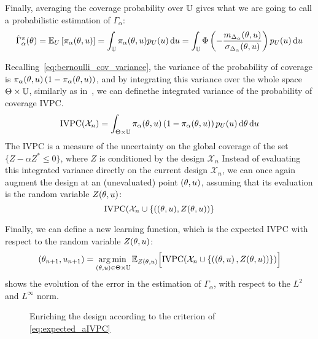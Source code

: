 \documentclass[../../Main_ManuscritThese.tex]{subfiles}
\newcommand\imgpath{/home/victor/acadwriting/Manuscrit/Text/Chapter4/img/}
\begin{document}
Finally, averaging the coverage probability over $\mathbb{U}$ gives what
we are going to call a probabilistic estimation of $\Gamma_{\alpha}$:
\begin{equation}
  \hat{\Gamma}_{\alpha}^{\pi}(\theta) = \mathbb{E}_U\left[\pi_{\alpha}(\theta,u)\right]=\int_{\mathbb{U}}\pi_{\alpha}(\theta,u)p_{U}(u) \,\mathrm{d}u = \int_{\mathbb{U}}\Phi\left(-\frac{m_{\Delta_\alpha}(\theta,u)}{\sigma_{\Delta_\alpha}(\theta,u)}\right)p_{U}(u) \,\mathrm{d}u
\end{equation}

Recalling~\cref{eq:bernoulli_cov_variance}, the variance of the
probability of coverage is
$\pi_\alpha(\theta, u) \left(1 - \pi_{\alpha}(\theta,u)\right)$, and by
integrating this variance over the whole space
$\Theta \times \mathbb{U}$, similarly as in~\cite{bect_sequential_2012},
we can definethe integrated variance of the probability of coverage
$\mathrm{IVPC}$.
\begin{equation}
  \label{eq:IVPC_def}
  \mathrm{IVPC}(\mathcal{X}_n) =  \int_{\Theta \times \mathbb{U}} \pi_{\alpha}(\theta, u) \left(1 - \pi_{\alpha}(\theta, u)\right)p_{U}(u)\,\mathrm{d}\theta \,\mathrm{d}u
\end{equation}
The $\mathrm{IVPC}$ is a measure of the uncertainty on the global
coverage of the set $\{Z - \alpha Z^* \leq 0\}$, where $Z$ is
conditioned by the design $\mathcal{X}_n$ Instead of evaluating this
integrated variance directly on the current design $\mathcal{X}_n$, we
can once again augment the design at an (unevaluated) point
$(\theta, u)$, assuming that its evaluation is the random variable
$Z(\theta, u)$:
\begin{equation}
  \mathrm{IVPC}(\mathcal{X}_n \cup \{((\theta, u), Z(\theta, u))\}
\end{equation}

Finally, we can define a new learning function, which is the expected
$\mathrm{IVPC}$ with respect to the random variable $Z(\theta, u)$:
\begin{equation}
  \label{eq:expected_aIVPC}
  (\theta_{n+1},u_{n+1}) = \operatorname*{arg\,min \,}_{(\theta, u)\in \Theta\times\mathbb{U}} \mathbb{E}_{Z(\theta, u)}\Big[\mathrm{IVPC}(\mathcal{X}_n \cup \{   \left(\left(\theta, u \right), Z(\theta, u) \right)  \} )     \Big]
\end{equation}
 shows the evolution of the error in the
estimation of $\Gamma_{\alpha}$, with respect to the $L^2$ and
$L^{\infty}$ norm.
\begin{figure}[ht]
  \centering
  
  \caption{\label{fig:IVPC_enrichment} Enriching the design according to the criterion of \cref{eq:expected_aIVPC}}
\end{figure}
\end{document}

